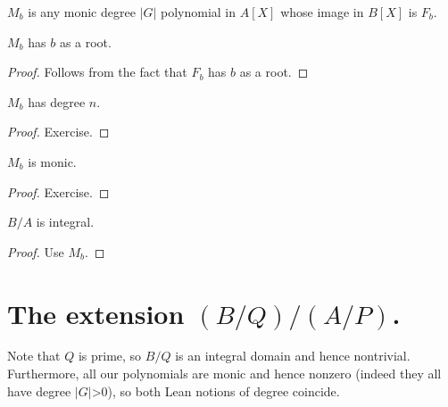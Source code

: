 \begin{definition}
  \label{MulSemiringAction.CharacteristicPolynomial.M}
  \leanok
  $M_b$ is any monic degree $|G|$ polynomial in $A[X]$ whose
  image in $B[X]$ is $F_b$.
\end{definition}

\begin{lemma}
  \label{MulSemiringAction.CharacteristicPolynomial.M_eval_eq_zero}
  \leanok
  $M_b$ has $b$ as a root.
\end{lemma}
\begin{proof}
  \leanok
  Follows from the fact that $F_b$ has $b$ as a root.
\end{proof}
\begin{lemma}
  \label{MulSemiringAction.CharacteristicPolynomial.M_deg}
  \leanok
  $M_b$ has degree $n$.
\end{lemma}
\begin{proof}
  \leanok
  Exercise.
\end{proof}
\begin{lemma}
  \label{MulSemiringAction.CharacteristicPolynomial.M_monic}
  \leanok
  $M_b$ is monic.
\end{lemma}
\begin{proof}
  \leanok
  Exercise.
\end{proof}

\begin{theorem}
  \label{Algebra.IsInvariant.isIntegral}
  \mathlibok
  $B/A$ is integral.
\end{theorem}
\begin{proof}
  \mathlibok
  Use $M_b$.
\end{proof}

\section{The extension \texorpdfstring{$(B/Q)/(A/P)$}{(B/Q)/(A/P)}.}

Note that $Q$ is prime, so $B/Q$ is an integral domain and hence nontrivial.
Furthermore, all our polynomials are monic and hence nonzero (indeed they
all have degree $|G|$>0), so both Lean notions of degree coincide.

